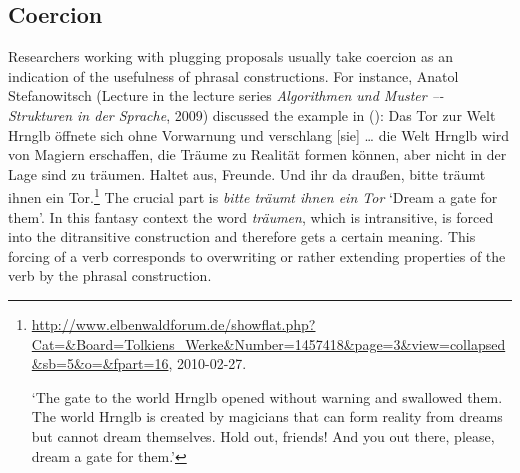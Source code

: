 \largerpage
\subsection{Coercion}
\label{coercion-sec}

Researchers working with plugging proposals usually take coercion as an indication of the usefulness of phrasal
constructions. For instance, Anatol Stefanowitsch (Lecture in the lecture series \emph{Algorithmen und Muster –-
  Strukturen in der Sprache}, 2009) discussed the example in ():
\ea
Das Tor zur Welt Hrnglb öffnete sich ohne Vorwarnung
und verschlang [sie] \ldots{} die Welt Hrnglb wird von Magiern
erschaffen, die Träume zu Realität formen können, aber
nicht in der Lage sind zu träumen. Haltet aus, Freunde.
Und ihr da draußen, bitte träumt ihnen ein Tor.\footnote{%
\url{http://www.elbenwaldforum.de/showflat.php?Cat=&Board=Tolkiens_Werke&Number=1457418&page=3&view=collapsed&sb=5&o=&fpart=16}, 2010-02-27.

`The gate to the world Hrnglb opened without warning and swallowed them. The world Hrnglb is created
by magicians that can form reality from dreams but cannot dream themselves. Hold out, friends! And
you out there, please, dream a gate for them.'
}
\z
The crucial part is \emph{bitte träumt ihnen ein Tor} `Dream a gate for them'. In this fantasy
context the word \emph{träumen}, which is intransitive, is forced into the ditransitive construction
and therefore gets a certain meaning. This forcing of a verb corresponds to overwriting or rather extending properties
of the verb by the phrasal construction.


